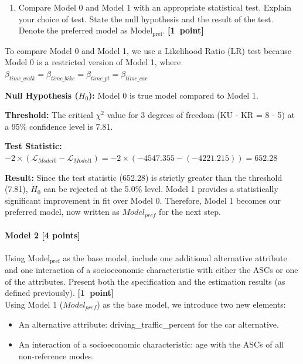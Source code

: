 \documentclass[11pt,a4paper]{article}
\begin{document}
\begin{enumerate}[resume]
	\item Compare Model 0 and Model 1 with an appropriate statistical test. Explain your choice of test. State the null hypothesis and the result of the test. Denote the preferred model as $\text{Model}_\text{pref}$. \textbf{[1~point]}
\end{enumerate}

To compare Model 0 and Model 1, we use a Likelihood Ratio (LR) test because Model 0 is a restricted version of Model 1, where $\beta_{time\_walk} = \beta_{time\_bike} = \beta_{time\_pt} = \beta_{time\_car}$
\begin{description}
    \item \textbf{Null Hypothesis ($H_0$):} Model 0 is true model compared to Model 1.
    \item \textbf{Threshold:} 
The critical $\chi^2$ value for 3 degrees of freedom (KU - KR = 8 - 5) at a 95\% confidence level is 7.81.
    \item \textbf{Test Statistic:} 
$-2 \times (\mathcal{L}_{Model0} - \mathcal{L}_{Model1}) = -2 \times (-4547.355 - (-4221.215) ) = 652.28$
\item \textbf{Result:} Since the test statistic (652.28) is strictly greater than the threshold (7.81), $H_0$ can be rejected at the 5.0\% level. 
Model 1 provides a statistically significant improvement in fit over Model 0. 
Therefore, Model 1 becomes our preferred model, now written as $Model_{pref}$ for the next step.
\end{description}

\paragraph{Model 2 [4 points]} Using $\text{Model}_\text{pref}$ as the base model, include one additional alternative attribute and one interaction of a socioeconomic characteristic with either the ASCs or one of the attributes. Present both the specification and the estimation results (as defined previously). \textbf{[1~point]}\\

Using Model 1 ($Model_{pref}$) as the base model, we introduce two new elements: 
\begin{itemize}
    \item An alternative attribute: driving\_traffic\_percent for the car alternative.
    \item An interaction of a socioeconomic characteristic: age with the ASCs of all non-reference modes.
\end{itemize}
\end{document}
